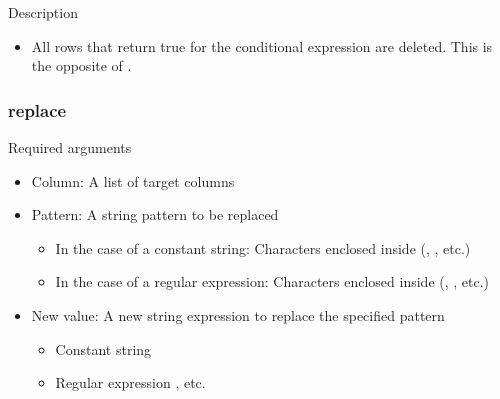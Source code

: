 \documentclass[letterpaper,10pt,english]{sphinxmanual}
\begin{document}
Description
\begin{itemize}
\item {} 
All rows that return true for the conditional expression are deleted. This is the opposite of {\hyperref[\detokenize{discovery/part07/rule_kinds:keep}]{}}.

\end{itemize}


\subsubsection{replace}
\label{\detokenize{discovery/part07/rule_kinds:replace}}
\begin{figure}[H]
\centering

\noindent{}
\end{figure}

Required arguments
\begin{itemize}
\item {} 
Column: A list of target columns

\item {} 
Pattern: A string pattern to be replaced
\begin{itemize}
\item {} 
In the case of a constant string: Characters enclosed inside  (, ,  etc.)

\item {} 
In the case of a regular expression: Characters enclosed inside \sphinxcode{\sphinxupquote{/}} (\sphinxcode{\sphinxupquote{/{[} ,\_{]}+/}}, , etc.)

\end{itemize}

\item {} 
New value: A new string expression to replace the specified pattern
\begin{itemize}
\item {} 
Constant string

\item {} 
Regular expression , etc.

\end{itemize}

\end{itemize}
\end{document}
